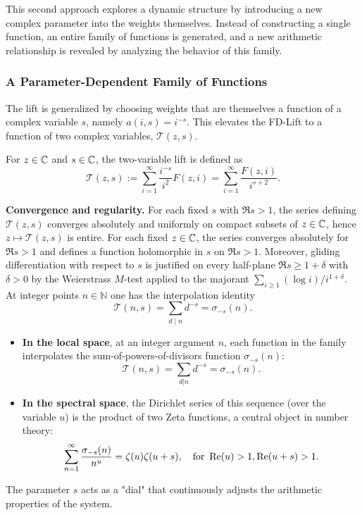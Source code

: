 This second approach explores a dynamic structure by introducing a new complex parameter into the weights themselves. Instead of constructing a single function, an entire family of functions is generated, and a new arithmetic relationship is revealed by analyzing the behavior of this family.

\subsubsection{A Parameter-Dependent Family of Functions}
The lift is generalized by choosing weights that are themselves a function of a complex variable $s$, namely $a(i,s) = i^{-s}$. This elevates the FD-Lift to a function of two complex variables, $\mathcal{T}(z,s)$.

\begin{definition}
For $z \in \mathbb{C}$ and $s \in \mathbb{C}$, the two-variable lift is defined as
\[\mathcal{T}(z,s) := \sum_{i=1}^{\infty} \frac{i^{-s}}{i^2} F(z,i) = \sum_{i=1}^{\infty} \frac{F(z,i)}{i^{s+2}}.\]
\end{definition}

\noindent\textbf{Convergence and regularity.}
For each fixed $s$ with $\Re s>1$, the series defining $\mathcal{T}(z,s)$ converges absolutely and uniformly on compact subsets of $z\in\mathbb{C}$, hence $z\mapsto\mathcal{T}(z,s)$ is entire.
For each fixed $z\in\mathbb{C}$, the series converges absolutely for $\Re s>1$ and defines a function holomorphic in $s$ on $\Re s>1$.
Moreover, gliding differentiation with respect to $s$ is justified on every half-plane $\Re s\ge 1+\delta$ with $\delta>0$ by the Weierstrass $M$-test applied to the majorant $\sum_{i\ge1}(\log i)/i^{1+\delta}$.
At integer points $n\in\mathbb{N}$ one has the interpolation identity
\[
\mathcal{T}(n,s)=\sum_{d\mid n} d^{-s}=\sigma_{-s}(n).
\]

\begin{itemize}
    \item \textbf{In the local space}, at an integer argument $n$, each function in the family interpolates the sum-of-powers-of-divisors function $\sigma_{-s}(n)$:
    \[
    \mathcal{T}(n,s) = \sum_{d|n} d^{-s} = \sigma_{-s}(n).
    \]
    \item \textbf{In the spectral space}, the Dirichlet series of this sequence (over the variable $u$) is the product of two Zeta functions, a central object in number theory:
    \[
    \sum_{n=1}^{\infty}\frac{\sigma_{-s}(n)}{n^u} = \zeta(u)\zeta(u+s), \quad \text{for } \operatorname{Re}(u)>1, \operatorname{Re}(u+s)>1.
    \]
\end{itemize}
The parameter $s$ acts as a "dial" that continuously adjusts the arithmetic properties of the system.

